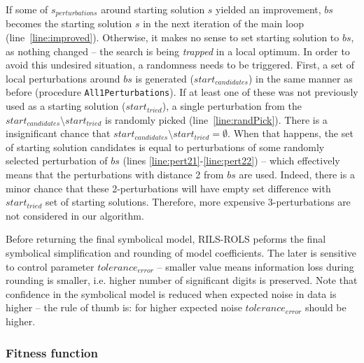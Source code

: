 \documentclass[a4paper,12pt]{elsarticle}
\begin{document}
If some of $s_{perturbations}$ around starting solution $s$ yielded an improvement, $bs$ becomes the starting solution $s$ in the next iteration of the main loop (line~\ref{line:improved}). 
Otherwise, it makes no sense to set starting solution to $bs$, as nothing changed -- the search is being  \emph{trapped} in a local optimum. In order to avoid this undesired situation, a randomness needs to be triggered. First, a set of local perturbations around $bs$ is generated ($start_{candidates}$) in the same manner as before (procedure \texttt{All1Perturbations}). If at least one of these was not previously used as a starting solution ($start_{tried}$), a single perturbation from the $start_{candidates} \setminus start_{tried}$ is randomly picked (line~\ref{line:randPick}). There is a insignificant chance that $start_{candidates} \setminus start_{tried} = \emptyset$. When that happens, the set of starting solution candidates is equal to perturbations of some randomly selected perturbation of $bs$ (lines \ref{line:pert21}-\ref{line:pert22}) -- which effectively means that the perturbations with distance 2 from $bs$ are used. Indeed, there is a minor chance that these 2-perturbations will have empty set difference with $start_{tried}$ set of starting solutions. Therefore, more expensive 3-perturbations are not considered in our algorithm. 


Before returning the final symbolical model, RILS-ROLS peforms the final symbolical simplification and rounding of model coefficients. The later is sensitive to control parameter $tolerance_{error}$ -- smaller value means information loss during rounding is smaller, i.e. higher number of significant digits is preserved. Note that confidence in the symbolical model is reduced when expected noise in data is higher -- the rule of thumb is: for higher expected noise $tolerance_{error}$ should be higher. 


\subsubsection{Fitness function}\label{sec:fitness}
\end{document}
